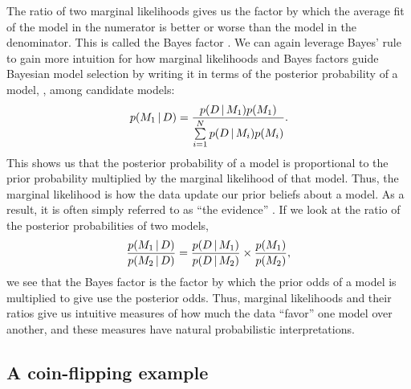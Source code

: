 \begin{linenomath}
The ratio of two marginal likelihoods gives us the factor by which the
average fit of the model in the numerator is better or worse than the
model in the denominator.
This is called the Bayes factor \citep{Jeffreys1935}.
We can again leverage Bayes' rule to gain more intuition for how marginal
likelihoods and Bayes factors guide Bayesian model selection by
writing it in terms of the posterior probability of a model, \model[1],
among \nmodels candidate models:
\begin{equation}
    p(\model[1] \given \data) = \frac{
        p(\data \given \model[1])
        p(\model[1])
    }{
        \sum\limits_{i=1}^{\nmodels}
        p(\data \given \model[i])
        p(\model[i])
    }.
    \label{eq:bayesRuleModelProbability}
\end{equation}
This shows us that the posterior probability of a model is proportional to the
prior probability multiplied by the marginal likelihood of that model.
Thus, the marginal likelihood is how the data update our prior beliefs about a
model.
As a result, it is often simply referred to as ``the evidence''
\citep{MacKay2005}.
If we look at the ratio of the posterior probabilities of two models,
\begin{equation}
    \frac{
        p(\model[1] \given \data)
    }{
        p(\model[2] \given \data)
    }
    =
    \frac{
        p(\data \given \model[1])
    }{
        p(\data \given \model[2])
    }
    \times
    \frac{
        p(\model[1])
    }{
        p(\model[2])
    },
    \label{eq:modelOdds}
\end{equation}
we see that the Bayes factor is the factor by which the prior odds of a model
is multiplied to give use the posterior odds.
Thus, marginal likelihoods and their ratios give us intuitive measures of how
much the data ``favor'' one model over another, and these measures have natural
probabilistic interpretations.
\end{linenomath}

\subsection{A coin-flipping example}

